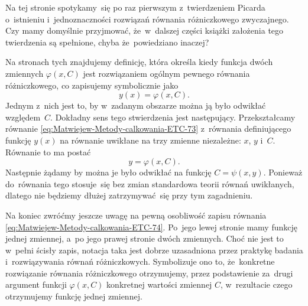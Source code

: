 \documentclass[a4paper,11pt]{article}
\numberwithin{equation}{section}
\begin{document}
\noindent
{} Na tej stronie spotykamy~się po raz pierwszym z~twierdzeniem
Picarda o~istnieniu i~jednoznaczności rozwiązań równania różniczkowego
zwyczajnego. Czy mamy domyślnie przyjmować, że~w~dalszej części książki
założenia tego twierdzenia są spełnione, chyba że~powiedziano inaczej?

\VerSpaceFour





\noindent
{} Na stronach tych znajdujemy definicję, która określa kiedy
funkcja dwóch zmiennych $\varphi( x, C )$ jest rozwiązaniem ogólnym pewnego
równania różniczkowego, co zapisujemy symbolicznie jako
\begin{equation}
  \label{eq:Matwiejew-Metody-calkowania-ETC-74}
  y( x ) = \varphi( x, C ).
\end{equation}
Jednym z~nich jest to, by w~zadanym obszarze można ją było odwikłać
względem~$C$. Dokładny sens tego stwierdzenia jest następujący.
Przekształcamy równanie \eqref{eq:Matwiejew-Metody-calkowania-ETC-73}
z~równania definiującego funkcję $y( x )$ na równanie uwikłane na trzy
zmienne niezależne: $x$, $y$ i~$C$. Równanie to ma postać
\begin{equation}
  \label{eq:Matwiejew-Metody-calkowania-ETC-75}
  y = \varphi( x, C ).
\end{equation}
Następnie żądamy by można je było odwikłać na funkcję $C = \psi( x, y )$.
Ponieważ do~równania tego stosuje~się bez zmian standardowa teorii równań
uwikłanych, dlatego nie będziemy dłużej zatrzymywać~się przy tym
zagadnieniu.

Na koniec zwróćmy jeszcze uwagę na pewną osobliwość zapisu równania
\eqref{eq:Matwiejew-Metody-calkowania-ETC-74}. Po~jego lewej stronie mamy
funkcję jednej zmiennej, a~po jego prawej stronie dwóch zmiennych. Choć nie
jest to w~pełni ścisły zapis, notacja taka jest dobrze uzasadniona
przez praktykę badania i~rozwiązywania równań różniczkowych. Symbolizuje
ono to, że~konkretne rozwiązanie równania różniczkowego otrzymujemy, przez
podstawienie za~drugi argument funkcji $\varphi( x, C )$ konkretnej wartości
zmiennej $C$, w~rezultacie czego otrzymujemy funkcję jednej zmiennej.

\VerSpaceFour
\end{document}
